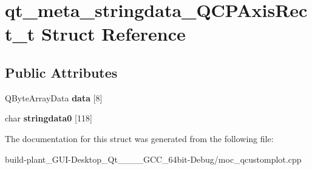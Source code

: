 \hypertarget{structqt__meta__stringdata__QCPAxisRect__t}{}\section{qt\+\_\+meta\+\_\+stringdata\+\_\+\+Q\+C\+P\+Axis\+Rect\+\_\+t Struct Reference}
\label{structqt__meta__stringdata__QCPAxisRect__t}
\subsection*{Public Attributes}
\begin{DoxyCompactItemize}
\item 
\mbox{\label{structqt__meta__stringdata__QCPAxisRect__t_abe371091541ce1b738a7026d4387d5b2}} 
Q\+Byte\+Array\+Data {\bfseries data} \mbox{[}8\mbox{]}
\item 
\mbox{\label{structqt__meta__stringdata__QCPAxisRect__t_a7263fed0445758459e2610e1b9fffe05}} 
char {\bfseries stringdata0} \mbox{[}118\mbox{]}
\end{DoxyCompactItemize}


The documentation for this struct was generated from the following file\+:\begin{DoxyCompactItemize}
\item 
build-\/plant\+\_\+\+G\+U\+I-\/\+Desktop\+\_\+\+Qt\+\_\+\_\+\_\+\_\+\+G\+C\+C\+\_\+64bit-\/\+Debug/moc\+\_\+qcustomplot.\+cpp\end{DoxyCompactItemize}
